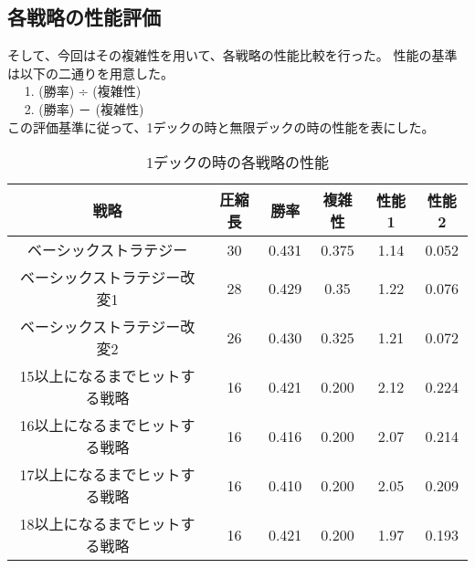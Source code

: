 \subsection{各戦略の性能評価}

そして、今回はその複雑性を用いて、各戦略の性能比較を行った。
性能の基準は以下の二通りを用意した。\\
~~ 1. (勝率) ÷ (複雑性)\\
~~ 2. (勝率) － (複雑性)\\
この評価基準に従って、1デックの時と無限デックの時の性能を表にした。




\begin{table}[H]
\caption{1デックの時の各戦略の性能}
\label{table:data_type}
\begin{center}
\begin{tabular}{|c|c|c|c|c|c|}
\hline
戦略           & 圧縮長 & 勝率    & 複雑性   & 性能1  & 性能2   \\ \hline
ベーシックストラテジー         & 30  & 0.431 & 0.375 & 1.14 & 0.052 \\ \hline
ベーシックストラテジー改変1      & 28  & 0.429 & 0.35  & 1.22 & 0.076 \\ \hline
ベーシックストラテジー改変2      & 26  & 0.430 & 0.325 & 1.21 & 0.072 \\ \hline
15以上になるまでヒットする戦略 & 16  & 0.421 & 0.200 & 2.12 & 0.224 \\ \hline
16以上になるまでヒットする戦略 & 16  & 0.416 & 0.200 & 2.07 & 0.214 \\ \hline
17以上になるまでヒットする戦略 & 16  & 0.410 & 0.200 & 2.05 & 0.209 \\ \hline
18以上になるまでヒットする戦略 & 16  & 0.421 & 0.200 & 1.97 & 0.193 \\ \hline
\end{tabular}
\end{center}
\end{table}



